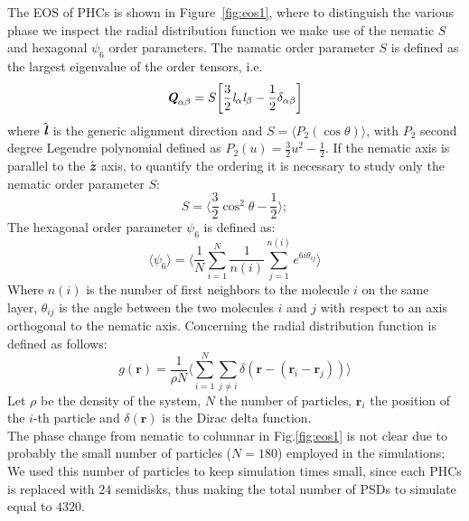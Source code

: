 \documentclass[aip,jcp, amsmath, amssymb, reprint]{revtex4-1}
\begin{document}
The EOS of PHCs is shown in Figure~\ref{fig:eos1}, where to distinguish the various phase we inspect the radial distribution function we make use of the 
nematic $S$ and hexagonal $\psi_6$ order parameters.
The namatic order parameter $S$ is defined as the largest eigenvalue of the order tensors, i.e.
\begin{equation} 
\label{tensornematic} 
\textit{\textbf{Q}}_{\alpha \beta}=S \bigg[\frac{3}{2} \textit{l}_{\alpha} \textit{l}_{\beta} - \frac{1}{2} \delta_{\alpha\beta} \bigg]
\end{equation}
where $\hat{\textit{\textbf{l}}}$ is the generic alignment direction and $S=\langle P_2(\cos \theta)\rangle$, with $P_2$ second degree Legendre polynomial defined as $P_2(u) = \frac{3}{2}u ^2-\frac{1}{2}$. If the nematic axis is parallel to the $\hat{\textit{\textbf{z}}}$ axis, to quantify the ordering it is necessary to study only the nematic order parameter $S$:
\begin{equation}  
\label{pordnem}
S= \bigg\langle \frac{3}{2} \cos^2\theta - \frac{1}{2} \bigg\rangle; 
\end{equation}
The hexagonal order parameter $\psi_6$ is defined as:
\begin{equation}  
\label{esa}
\langle \psi_6\rangle=\bigg\langle \frac{1}{N} \sum_{i=1}^N \frac{1}{n(i)} \sum_{j=1}^{n(i)}e^{6i\theta_{ij}} \bigg\rangle
\end{equation}
Where $n(i)$ is the number of first neighbors to the molecule $i$ on the same layer, $\theta_{ij}$ is the angle between the two molecules $i$ and $j$ with respect to an axis orthogonal to the nematic axis. Concerning the radial distribution function is defined as follows:
\begin{equation}
	g(\textbf{r})=\frac{1}{\rho N} \biggl \langle \sum^N_{i=1} \sum_{j\neq i} \delta ( \mathbf{r} - (\textbf{r}_i-\textbf{r}_j))\biggl \rangle
\end{equation}
Let $\rho$ be the density of the system, $N$ the number of particles, $\mathbf{r}_i$ the position of the $i$-th particle and $ \delta(\mathbf{r})$ is the Dirac delta function.\\ 

The phase change from nematic to columnar in Fig.\ref{fig:eos1} is not clear due to probably the small number of particles  ($N=180$) employed in the simulations; We used this number of particles
to keep simulation times small, since each PHCs is replaced with $24$ semidisks, thus making the total number of PSDs to simulate equal to $4320$.
\end{document}
